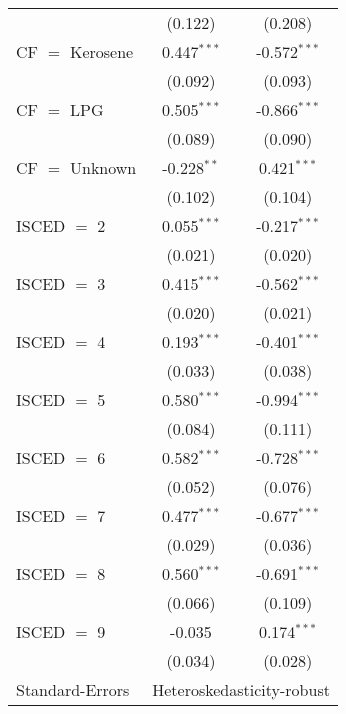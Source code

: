 \begin{table}[htbp!]
\begin{adjustbox}{width = 1\textwidth, max height = 0.95\textheight, center}
\begin{threeparttable}[b]
\begin{tabular}{lcc}
                                 & (0.122)        & (0.208)\\   
            CF $=$ Kerosene      & 0.447$^{***}$  & -0.572$^{***}$\\   
                                 & (0.092)        & (0.093)\\   
            CF $=$ LPG           & 0.505$^{***}$  & -0.866$^{***}$\\   
                                 & (0.089)        & (0.090)\\   
            CF $=$ Unknown       & -0.228$^{**}$  & 0.421$^{***}$\\   
                                 & (0.102)        & (0.104)\\   
            ISCED $=$ 2          & 0.055$^{***}$  & -0.217$^{***}$\\   
                                 & (0.021)        & (0.020)\\   
            ISCED $=$ 3          & 0.415$^{***}$  & -0.562$^{***}$\\   
                                 & (0.020)        & (0.021)\\   
            ISCED $=$ 4          & 0.193$^{***}$  & -0.401$^{***}$\\   
                                 & (0.033)        & (0.038)\\   
            ISCED $=$ 5          & 0.580$^{***}$  & -0.994$^{***}$\\   
                                 & (0.084)        & (0.111)\\   
            ISCED $=$ 6          & 0.582$^{***}$  & -0.728$^{***}$\\   
                                 & (0.052)        & (0.076)\\   
            ISCED $=$ 7          & 0.477$^{***}$  & -0.677$^{***}$\\   
                                 & (0.029)        & (0.036)\\   
            ISCED $=$ 8          & 0.560$^{***}$  & -0.691$^{***}$\\   
                                 & (0.066)        & (0.109)\\   
            ISCED $=$ 9          & -0.035         & 0.174$^{***}$\\   
                                 & (0.034)        & (0.028)\\   
            \midrule 
            Standard-Errors & \multicolumn{2}{c}{Heteroskedasticity-robust} \\ 

\end{tabular}
\end{threeparttable}
\end{adjustbox}
\end{table}
